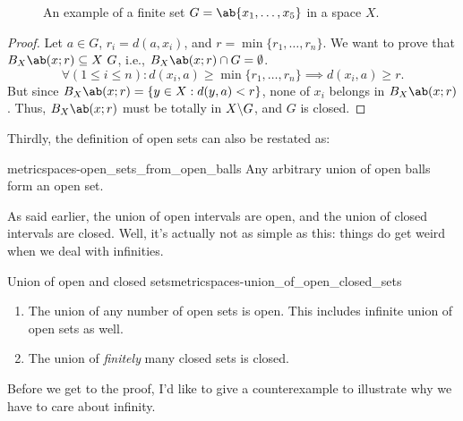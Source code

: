 \begin{figure}
  \centering
  
  \caption{An example of a finite set \(G = \ab\{x_1, \dots, x_5\}\) in a space \(X\).}
  \label{fig:metricspaces-finite_sets_are_closed}
\end{figure}

\begin{proof}
  Let \(a \in G\), \(r_i = d(a, x_i)\), and \(r = \min\{r_1, \dots, r_n\}\). We want
  to prove that \(\oball{X}{x}{r} \subseteq X \ G\), i.e., \(\oball{X}{x}{r} \cap G = \emptyset\).
  \begin{equation}
    \forall (1 \leq i \leq n) : d(x_i, a) \geq \min\{r_1, \dots, r_n\} \implies d(x_i, a) \geq r.
  \end{equation}
  But since \(\oball{X}{x}{r} = \{y \in X: d(y, a) < r\}\), none of \(x_i\) belongs
  in \(\oball{X}{x}{r}\). Thus, \(\oball{X}{x}{r}\) must be totally in \(X \backslash G\),
  and \(G\) is closed.
\end{proof}

Thirdly, the definition of open sets can also be restated as:
\begin{cor}{}{metricspaces-open_sets_from_open_balls}
  Any arbitrary union of open balls form an open set.
\end{cor}

As said earlier, the union of open intervals are open, and the union of closed intervals are
closed. Well, it's actually not as simple as this: things do get weird when we deal with infinities.

\begin{prop}{Union of open and closed sets}{metricspaces-union_of_open_closed_sets}
  \begin{enumerate}
    \item The union of any number of open sets is open. This includes infinite union
          of open sets as well. \label{ite:metricspaces-union_of_open_closed_sets-1}
    \item The union of \emph{finitely} many closed sets is closed.
          \label{ite:metricspaces-union_of_open_closed_sets-2}
  \end{enumerate}
\end{prop}

Before we get to the proof, I'd like to give a counterexample to illustrate why we have
to care about infinity.

